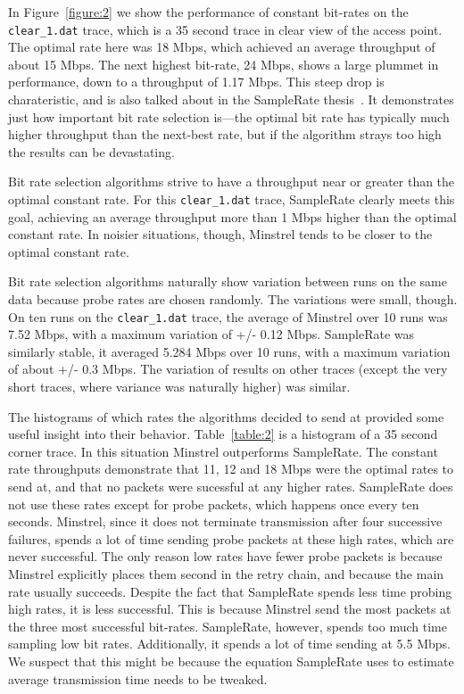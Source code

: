 \documentclass[twocolumn,10pt]{article}
\begin{document}
In Figure~\ref{figure:2} we show the performance of constant bit-rates
on the \texttt{clear\_1.dat} trace, which is a 35 second trace in
clear view of the access point.  The optimal rate here was 18 Mbps,
which achieved an average throughput of about 15 Mbps.  The next
highest bit-rate, 24 Mbps, shows a large plummet in performance, down
to a throughput of 1.17 Mbps.  This steep drop is charateristic, and
is also talked about in the SampleRate thesis~\cite{samplerate}.  It
demonstrates just how important bit rate selection is---the optimal
bit rate has typically much higher throughput than the next-best rate,
but if the algorithm strays too high the results can be devastating.

Bit rate selection algorithms strive to have a throughput near or
greater than the optimal constant rate.  For this \verb|clear_1.dat|
trace, SampleRate clearly meets this goal, achieving an average
throughput more than 1 Mbps higher than the optimal constant rate.  In
noisier situations, though, Minstrel tends to be closer to the optimal
constant rate.

Bit rate selection algorithms naturally show variation between runs on
the same data because probe rates are chosen randomly.  The variations
were small, though.  On ten runs on the \texttt{clear\_1.dat} trace,
the average of Minstrel over 10 runs was 7.52 Mbps, with a maximum
variation of +/- 0.12 Mbps.  SampleRate was similarly stable, it
averaged 5.284 Mbps over 10 runs, with a maximum variation of about
+/- 0.3 Mbps.  The variation of results on other traces (except the
very short traces, where variance was naturally higher) was similar.

The histograms of which rates the algorithms decided to send at
provided some useful insight into their behavior.  Table~\ref{table:2}
is a histogram of a 35 second corner trace.  In this situation
Minstrel outperforms SampleRate.  The constant rate throughputs
demonstrate that 11, 12 and 18 Mbps were the optimal rates to send at,
and that no packets were sucessful at any higher rates.  SampleRate
does not use these rates except for probe packets, which happens once
every ten seconds.  Minstrel, since it does not terminate transmission
after four successive failures, spends a lot of time sending probe
packets at these high rates, which are never successful.  The only
reason low rates have fewer probe packets is because Minstrel
explicitly places them second in the retry chain, and because the main
rate usually succeeds.  Despite the fact that SampleRate spends less
time probing high rates, it is less successful.  This is because
Minstrel send the most packets at the three most successful bit-rates.
SampleRate, however, spends too much time sampling low bit rates.
Additionally, it spends a lot of time sending at 5.5 Mbps.  We suspect
that this might be because the equation SampleRate uses to estimate
average transmission time needs to be tweaked.
\end{document}
